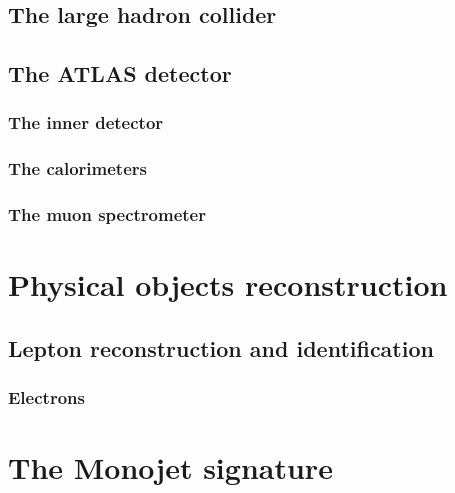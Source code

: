 \documentclass[10pt,twoside,cucitura,classica,english,openany]{toptesi}
\begin{document}
\section{The large hadron collider}
\label{sec:large-hadr-coll}



\section{The ATLAS detector}
\label{sec:atlas-detector}

\subsection{The inner detector}
\label{sec:inner-detector}



\subsection{The calorimeters}
\label{sec:calorimeters}



\subsection{The muon spectrometer}
\label{sec:muon-spectrometer}



\chapter{Physical objects reconstruction}
\label{cha:phys-objects-reconst}

\section{Lepton reconstruction and identification}
\label{sec:lept-reconstr-ident}



\subsection{Electrons}
\label{sec:electrons}



\chapter{The Monojet signature}
\label{cha:monojet-signature}
\end{document}
